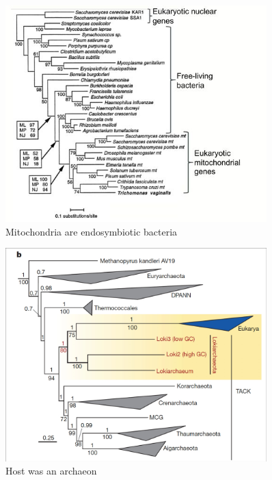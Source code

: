 \documentclass[]{article}
\begin{document}
\begin{figure}[H]
	\begin{center}
		\caption[Mitochondria are endosymbiotic bacteria]{Mitochondria are endosymbiotic bacteria\cite{germot1996presence}} 	\label{fig:Mitochondria:are:endosymbiotic:bacteria}
		\includegraphics[width=0.9\textwidth]{MitochondriaEndosymbiotic}
	\end{center}
\end{figure}

\begin{figure}[H]
	\caption[Host was an archaeon]{Host was an archaeon\cite{spang2015complex}}
	\label{fig:host:archaeon}
	\includegraphics[width=0.9\textwidth]{HostArchaeon}
\end{figure}
\end{document}
